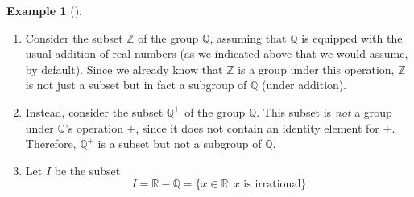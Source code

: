 \documentclass[10pt,]{book}
\theoremstyle{plain}
\theoremstyle{definition}
\theoremstyle{definition}
\theoremstyle{definition}
\newtheorem{example}[theorem]{Example}
\theoremstyle{definition}
\numberwithin{equation}{section}
\def\Z{\mathbb{Z}}
\def\R{\mathbb{R}}
\def\Q{\mathbb{Q}}
\begin{document}
\begin{example}[]\label{subsetvsubgp1}
\leavevmode%
\begin{enumerate}
\item\hypertarget{li-186}{}
            Consider the subset \(\Z\) of the group \(\Q\), assuming that \(\Q\) is equipped with the usual addition of real numbers (as we indicated above that we would assume, by default).  Since we already know that \(\Z\) is a group under this operation, \(\Z\) is not just a subset but in fact a subgroup of \(\Q\) (under addition).
\item\hypertarget{li-187}{}
            Instead, consider the subset \(\Q^+\) of the group \(\Q\).  This
            subset is \emph{not} a group under \(\Q\)'s operation \(+\),
            since it does not contain an identity element for \(+\).  Therefore,
            \(\Q^+\) is a subset but not a subgroup of \(\Q\).
\item\hypertarget{li-188}{}
            Let \(I\) be the subset
\begin{equation*}

              I=\R-\Q=\{x\in \R: x
              \text{ is irrational} \}
            
\end{equation*}


\end{enumerate}
\end{example}
\end{document}
